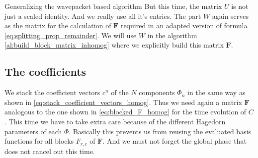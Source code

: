 \begin{chapter}{Generalizing the wavepacket based algorithm}
But this time, the matrix $U$ is not just a scaled identity. And we really use all it's entries.
The part $W$ again serves as the matrix for the calculation of $\mathbf{F}$ required in an
adapted version of formula \eqref{eq:splitting_prop_remainder}. We will use $W$
in the algorithm \ref{al:build_block_matrix_inhomog} where we explicitly build
this matrix $\mathbf{F}$.

\subsection{The coefficients}

We stack the coefficient vectors $c^n$ of the $N$ components $\Phi_n$ in the same
way as shown in \eqref{eq:stack_coefficient_vectors_homog}. Thus we need again a
matrix $\mathbf{F}$ analogous to the one shown in \eqref{eq:blocked_F_homog} for the
time evolution of $C$. This time we have to take extra care because of the different
Hagedorn parameters of each $\Phi$. Basically this prevents us from reusing the
evaluated basis functions for all blocks $F_{r,c}$ of $\mathbf{F}$. And we must
not forget the global phase that does not cancel out this time.


\end{chapter}
